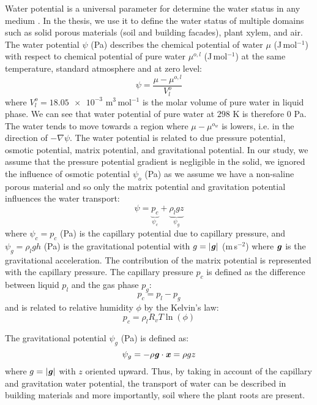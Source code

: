 Water potential is a universal parameter for determine the water status in any medium \citep{nobel2009physicochemical}. In the thesis, we use it to define the water status of multiple domains such as solid porous materials (soil and building facades), plant xylem, and air. The water potential $\psi$ (Pa) describes the chemical potential of water $\mu$ (J\,mol$^{-1}$) with respect to chemical potential of pure water $\mu^{o,l}$ (J\,mol$^{-1}$) at the same temperature, standard atmosphere and at zero level:
\begin{equation}
\psi = \frac{\mu - \mu^{o,l}}{V^o_l}
\end{equation}
where $V^o_l = 18.05 \num{e-3}$ m$^3$\,mol$^{-1}$ is the molar volume of pure water in liquid phase. We can see that water potential of pure water at $298$ K is therefore $0$ Pa. The water tends to move towards a region where $\mu-\mu^{o_w}$ is lowers, i.e. in the direction of $-\nabla\psi$. The water potential is related to due pressure potential, osmotic potential, matrix potential, and gravitational potential. In our study, we assume that the pressure potential gradient is negligible in the solid, we ignored the influence of osmotic potential $\psi_o$ (Pa) as we assume we have a non-saline porous material and so only the matrix potential and gravitation potential influences the water transport:
\begin{equation}
\psi = \underbrace{p_c}_{\psi_c} + \underbrace{\rho_l g z}_{\psi_g}
\end{equation}
where $\psi_c = p_c$ (Pa) is the capillary potential due to capillary pressure, and $\psi_g = \rho_l g h$ (Pa) is the gravitational potential with $g = |\textbf{\textit{g}}|$ (m\,s$^{-2}$) where $\textbf{\textit{g}}$ is the gravitational acceleration. The contribution of the matrix potential is represented with the capillary pressure. The capillary pressure $p_c$ is defined as the difference between liquid $p_l$ and the gas phase $p_g$:
\begin{equation}
p_c =  p_l - p_g
\end{equation}
and is related to relative humidity $\phi$ by the Kelvin's law:
\begin{equation}
p_c = \rho_l R_v T \ln \left(\phi\right)
\end{equation}

The gravitational potential $\psi_g$ (Pa) is defined as:
\begin{equation}
\psi_g = - \rho \textbf{\textit{g}} \cdot \textbf{\textit{x}} = \rho g z
\end{equation}
where $g = |\textbf{\textit{g}}|$ with $z$ oriented upward. Thus, by taking in account of the capillary and gravitation water potential, the transport of water can be described in building materials and more importantly, soil where the plant roots are present.

